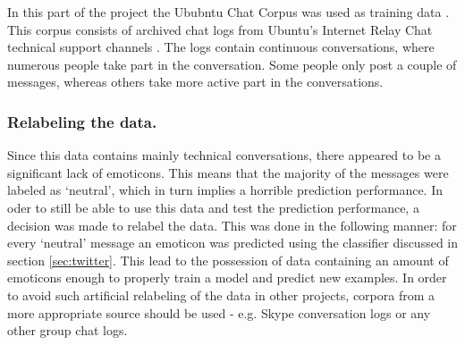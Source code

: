 In this part of the project the Ububntu Chat Corpus was used as training data . This corpus consists of archived chat logs  from Ubuntu's Internet Relay Chat technical support channels . The logs contain continuous conversations, where numerous people take part in the conversation. Some people only post a couple of messages, whereas others take more active part in the conversations. 

\subsubsection*{Relabeling the data.} 
Since this data contains mainly technical conversations, there appeared to be a significant lack of emoticons. This means that the majority of the messages were labeled as `neutral', which in turn implies a horrible prediction performance. In oder to still be able to use this data and test the prediction performance, a decision was made to relabel the data. This was done in the following manner: for every `neutral' message an emoticon was predicted using the classifier discussed in section \ref{sec:twitter}. This lead to the possession of data containing an amount of emoticons enough to properly train a model and predict new examples. In order to avoid such artificial relabeling of the data in other projects, corpora from a more appropriate source should be used - e.g. Skype conversation logs or any other group chat logs.  

